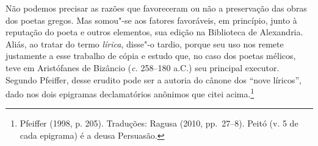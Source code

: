%
%


Não podemos precisar as razões que favoreceram ou não a
preservação das obras dos poetas gregos. Mas somou"-se aos fatores favoráveis,
em princípio, junto à reputação do poeta e outros elementos, sua edição na
Biblioteca de Alexandria. Aliás, ao tratar do termo \textit{lírica}, disse"-o
tardio, porque seu uso nos remete justamente a esse trabalho de cópia e estudo
que, no caso dos poetas mélicos, teve em Aristófanes de Bizâncio
(\textit{c.} 258--180 a.C.) seu principal executor. Segundo Pfeiffer, desse
erudito pode ser a autoria do cânone dos “nove líricos”,
dado nos dois epigramas declamatórios anônimos que citei
acima.\footnote{ Pfeiffer (1998, p. 205). Traduções: Ragusa (2010, pp.~27--8). Peitó (v. 5 de cada
epigrama) é a deusa Persuasão.}

